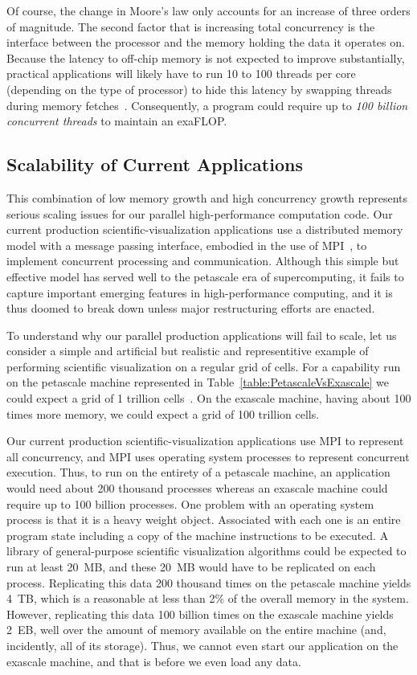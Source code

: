 \documentclass[conference]{IEEEtran}
\newcommand*{\lcite}[1]{~\cite{#1}}
\begin{document}
Of course, the change in Moore's law only accounts for an increase of three
orders of magnitude.  The second factor that is increasing total
concurrency is the interface between the processor and the memory holding
the data it operates on.  Because the latency to off-chip memory is not
expected to improve substantially, practical applications will likely have
to run 10 to 100 threads per core (depending on the type of processor) to
hide this latency by swapping threads during memory
fetches\lcite{ExascaleArchitecturesReport}.  Consequently, a program could
require up to \emph{100 billion concurrent threads} to maintain an
exaFLOP.

\subsection{Scalability of Current Applications}

\noindent
This combination of low memory growth and high concurrency growth
represents serious scaling issues for our parallel high-performance
computation code.  Our current production scientific-visualization
applications use a distributed memory model with a message passing
interface, embodied in the use of MPI\lcite{MPI}, to implement concurrent
processing and communication.  Although this simple but effective model has
served well to the petascale era of supercomputing, it fails to capture
important emerging features in high-performance computing, and it is thus
doomed to break down unless major restructuring efforts are enacted.

To understand why our parallel production applications will fail to scale,
let us consider a simple and artificial but realistic and representitive
example of performing scientific visualization on a regular grid of cells.
For a capability run on the petascale machine represented in
Table~\ref{table:PetascaleVsExascale} we could expect a grid of 1 trillion
cells\lcite{Childs2010}.  On the exascale machine, having about 100 times
more memory, we could expect a grid of 100 trillion cells.

Our current production scientific-visualization applications use MPI to
represent all concurrency, and MPI uses operating system processes to
represent concurrent execution.  Thus, to run on the entirety of a
petascale machine, an application would need about 200 thousand processes
whereas an exascale machine could require up to 100 billion processes.  One
problem with an operating system process is that it is a heavy weight
object.  Associated with each one is an entire program state including a
copy of the machine instructions to be executed.  A library of
general-purpose scientific visualization algorithms could be expected to
run at least 20~MB, and these 20~MB would have to be replicated on each
process.  Replicating this data 200 thousand times on the petascale machine
yields 4~TB, which is a reasonable at less than 2\% of the overall memory
in the system.  However, replicating this data 100 billion times on the
exascale machine yields 2~EB, well over the amount of memory available on
the entire machine (and, incidently, all of its storage).  Thus, we cannot
even start our application on the exascale machine, and that is before we
even load any data.
\end{document}
